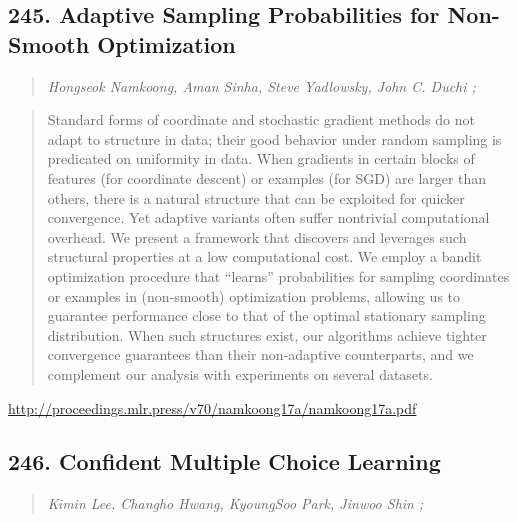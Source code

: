 \documentclass{article}
\begin{document}
\subsection{245. Adaptive Sampling Probabilities for Non-Smooth Optimization}

\begin{quote}
\footnotesize{\textit{Hongseok Namkoong, Aman Sinha, Steve Yadlowsky, John C. Duchi ;}}
\end{quote}

\begin{quote}
    Standard forms of coordinate and stochastic gradient methods do not adapt to structure in data; their good behavior under random sampling is predicated on uniformity in data. When gradients in certain blocks of features (for coordinate descent) or examples (for SGD) are larger than others, there is a natural structure that can be exploited for quicker convergence. Yet adaptive variants often suffer nontrivial computational overhead. We present a framework that discovers and leverages such structural properties at a low computational cost. We employ a bandit optimization procedure that “learns” probabilities for sampling coordinates or examples in (non-smooth) optimization problems, allowing us to guarantee performance close to that of the optimal stationary sampling distribution. When such structures exist, our algorithms achieve tighter convergence guarantees than their non-adaptive counterparts, and we complement our analysis with experiments on several datasets.  \end{quote}

\href{http://proceedings.mlr.press/v70/namkoong17a/namkoong17a.pdf}{http://proceedings.mlr.press/v70/namkoong17a/namkoong17a.pdf}

\subsection{246. Confident Multiple Choice Learning}

\begin{quote}
\footnotesize{\textit{Kimin Lee, Changho Hwang, KyoungSoo Park, Jinwoo Shin ;}}
\end{quote}
\end{document}
